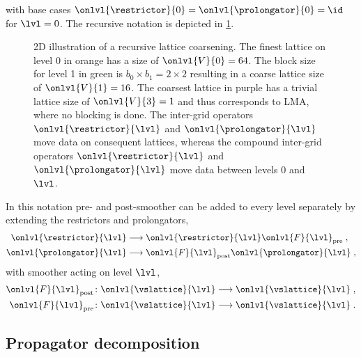 with base cases $\onlvl{\mathcal{\restrictor}}{0} = \onlvl{\mathcal{\prolongator}}{0} = \id$ for $\lvl=0$.
The recursive notation is depicted in \cref{fig:recursive:nesting}.
\begin{figure}
\centering
%

\caption{2D illustration of a recursive lattice coarsening. The finest lattice on level \num{0} in orange has a size of $\onlvl{V}{0}=64$. The block size for level \num{1} in green is $b_0\times b_1=2\times2$ resulting in a coarse lattice size of $\onlvl{V}{1}=16$. The coarsest lattice in purple has a trivial lattice size of $\onlvl{V}{3}=1$ and thus corresponds to LMA, where no blocking is done. The inter-grid operators $\onlvl{\restrictor}{\lvl}$ and $\onlvl{\prolongator}{\lvl}$ move data on consequent lattices, whereas the compound inter-grid operators $\onlvl{\mathcal{\restrictor}}{\lvl}$ and $\onlvl{\mathcal{\prolongator}}{\lvl}$ move data between levels \num{0} and $\lvl$. \takenfull }
\label{fig:recursive:nesting}
\end{figure}

In this notation pre- and post-smoother can be added to every level separately by extending the restrictors and prolongators,
\begin{align}
\onlvl{\restrictor}{\lvl} &\longrightarrow \onlvl{\restrictor}{\lvl} \onlvl{F}{\lvl}_{\text{pre}} \;, \\
\onlvl{\prolongator}{\lvl} &\longrightarrow \onlvl{F}{\lvl}_{\text{post}} \onlvl{\prolongator}{\lvl} \;,
\end{align}
with smoother acting on level $\lvl$,
\begin{align}
\onlvl{F}{\lvl}_{\text{post}} &\colon \onlvl{\vslattice}{\lvl} \longrightarrow \onlvl{\vslattice}{\lvl} \;, \\
\onlvl{F}{\lvl}_{\text{pre}} &\colon \onlvl{\vslattice}{\lvl} \longrightarrow \onlvl{\vslattice}{\lvl} \;.
\end{align}

\subsection{Propagator decomposition}

